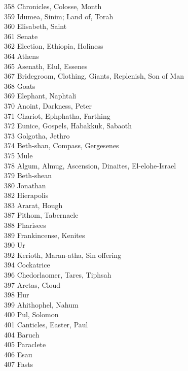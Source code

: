 358 \quad Chronicles, Colosse, Month\\
359 \quad Idumea, Sinim; Land of, Torah\\
360 \quad Elisabeth, Saint\\
361 \quad Senate\\
362 \quad Election, Ethiopia, Holiness\\
364 \quad Athens\\
365 \quad Asenath, Elul, Essenes\\
367 \quad Bridegroom, Clothing, Giants, Replenish, Son of Man\\
368 \quad Goats\\
369 \quad Elephant, Naphtali\\
370 \quad Anoint, Darkness, Peter\\
371 \quad Chariot, Ephphatha, Farthing\\
372 \quad Eunice, Gospels, Habakkuk, Sabaoth\\
373 \quad Golgotha, Jethro\\
374 \quad Beth-shan, Compass, Gergesenes\\
375 \quad Mule\\
378 \quad Algum, Almug, Ascension, Dinaites, El-elohe-Israel\\
379 \quad Beth-shean\\
380 \quad Jonathan\\
382 \quad Hierapolis\\
383 \quad Ararat, Hough\\
387 \quad Pithom, Tabernacle\\
388 \quad Pharisees\\
389 \quad Frankincense, Kenites\\
390 \quad Ur\\
392 \quad Kerioth, Maran-atha, Sin offering\\
394 \quad Cockatrice\\
396 \quad Chedorlaomer, Tares, Tiphsah\\
397 \quad Aretas, Cloud\\
398 \quad Hur\\
399 \quad Ahithophel, Nahum\\
400 \quad Pul, Solomon\\
401 \quad Canticles, Easter, Paul\\
404 \quad Baruch\\
405 \quad Paraclete\\
406 \quad Esau\\
407 \quad Fasts\\
